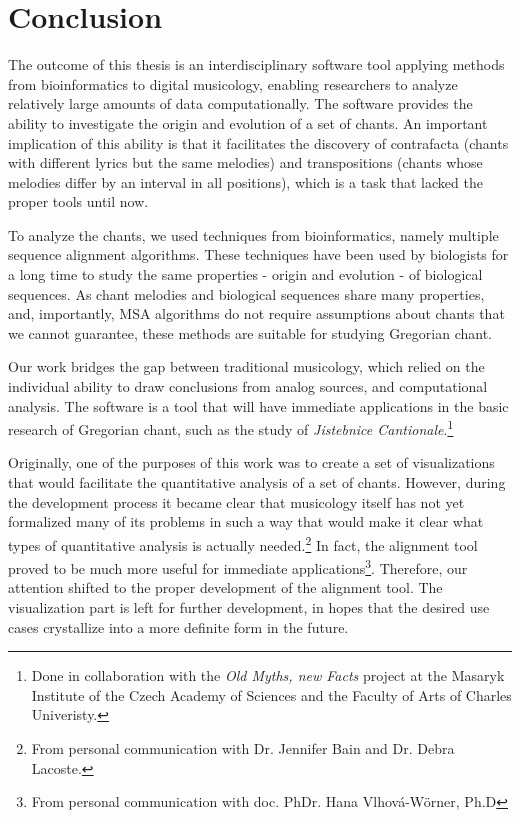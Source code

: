 \chapter*{Conclusion}

The outcome of this thesis is an interdisciplinary software tool applying methods from bioinformatics to digital musicology, enabling researchers
to analyze relatively large amounts of data computationally. The software
provides the ability to investigate the origin and evolution of a set of chants. An important implication of this ability is that it facilitates
the discovery of contrafacta (chants with different lyrics but the same melodies) and transpositions (chants whose melodies differ by an interval
in all positions), which is a task that lacked the proper tools until now.

To analyze the chants, we used techniques from bioinformatics, namely multiple sequence alignment algorithms. These techniques have been used by
biologists for a long time to study the same properties - origin and evolution - of biological sequences. As chant melodies and biological sequences
share many properties, and, importantly, MSA algorithms do not require assumptions about chants that we cannot guarantee, these methods are suitable
for studying Gregorian chant.

Our work bridges the gap between traditional musicology,
which relied on the individual ability to draw conclusions from analog sources, and computational analysis. The software is a tool
that will have immediate applications in the basic research of Gregorian chant, such as the study of \emph{Jistebnice Cantionale}.\footnote{
Done in collaboration with the \emph{Old Myths, new Facts} project at the Masaryk Institute of the Czech Academy of Sciences and the Faculty
of Arts of Charles Univeristy.}

Originally, one of the purposes of this work was to create a set of visualizations that would facilitate the quantitative analysis of a set of chants.
However, during the development process it became clear that musicology itself has not yet formalized many of its problems in such a way that 
would make it clear what types of quantitative analysis is actually needed.\footnote{From personal communication with Dr. Jennifer Bain and Dr.
Debra Lacoste.} In fact, the alignment tool proved to be much more useful for immediate
applications\footnote{From personal communication with doc. PhDr. Hana Vlhová-Wörner, Ph.D}. Therefore, our attention shifted to the proper
development of the alignment tool. The visualization part is left for further development, in hopes that the desired use cases crystallize into
a more definite form in the future.

